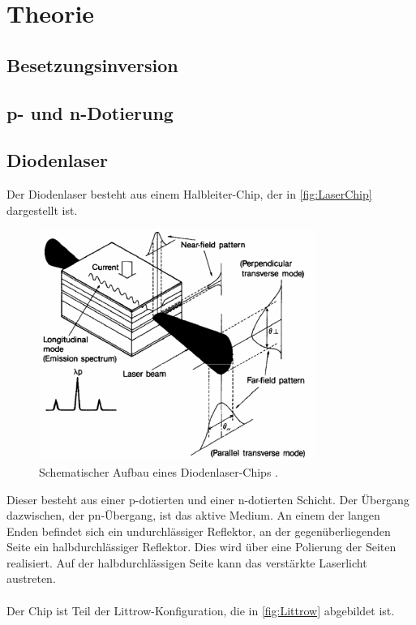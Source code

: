 \section{Theorie}
\label{sec:Theorie}

\subsection{Besetzungsinversion}


\subsection{p- und n-Dotierung}


\subsection{Diodenlaser}
Der Diodenlaser besteht aus einem Halbleiter-Chip, der in \autoref{fig:LaserChip} 
dargestellt ist.
\begin{figure}
    \centering
    \includegraphics[width=0.8\textwidth]{LaserChip.png}
    \caption{Schematischer Aufbau eines Diodenlaser-Chips \cite{ap60}.}
    \label{fig:LaserChip}
\end{figure}
Dieser besteht aus einer p-dotierten und einer n-dotierten Schicht. Der Übergang 
dazwischen, der pn-Übergang, ist das aktive Medium. An einem der langen Enden befindet sich ein 
undurchlässiger Reflektor, an der gegenüberliegenden Seite ein halbdurchlässiger Reflektor. Dies wird über 
eine Polierung der Seiten realisiert. Auf der halbdurchlässigen Seite kann das verstärkte Laserlicht austreten.
\\
\\
Der Chip ist Teil der Littrow-Konfiguration, die in \autoref{fig:Littrow} abgebildet ist. 
